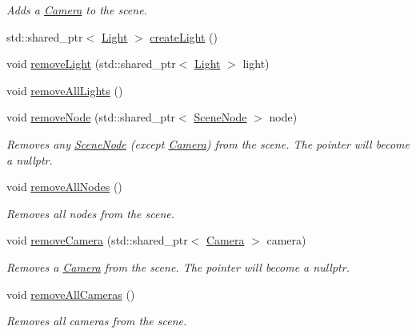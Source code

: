 \begin{DoxyCompactItemize}
\begin{DoxyCompactList}\small\item\em Adds a \hyperlink{classburn_1_1_camera}{Camera} to the scene. \end{DoxyCompactList}\item 
std\-::shared\-\_\-ptr$<$ \hyperlink{classburn_1_1_light}{Light} $>$ \hyperlink{classburn_1_1_scene_a72924fb917b9f55cd7268b65ac81b59d}{create\-Light} ()
\item 
void \hyperlink{classburn_1_1_scene_a60272f8aad568d7475449c649587b9fa}{remove\-Light} (std\-::shared\-\_\-ptr$<$ \hyperlink{classburn_1_1_light}{Light} $>$ light)
\item 
void \hyperlink{classburn_1_1_scene_aeb92e9aea3bbff01d8039ef3b9143f56}{remove\-All\-Lights} ()
\item 
void \hyperlink{classburn_1_1_scene_a3bbc514d911206f374ba54a2efd97c40}{remove\-Node} (std\-::shared\-\_\-ptr$<$ \hyperlink{classburn_1_1_scene_node}{Scene\-Node} $>$ node)
\begin{DoxyCompactList}\small\item\em Removes any \hyperlink{classburn_1_1_scene_node}{Scene\-Node} (except \hyperlink{classburn_1_1_camera}{Camera}) from the scene. The pointer will become a nullptr. \end{DoxyCompactList}\item 
void \hyperlink{classburn_1_1_scene_a2fed244c443937c2656cdc0f65780960}{remove\-All\-Nodes} ()
\begin{DoxyCompactList}\small\item\em Removes all nodes from the scene. \end{DoxyCompactList}\item 
void \hyperlink{classburn_1_1_scene_a2023bc9e2e228c51070d41976bc71a33}{remove\-Camera} (std\-::shared\-\_\-ptr$<$ \hyperlink{classburn_1_1_camera}{Camera} $>$ camera)
\begin{DoxyCompactList}\small\item\em Removes a \hyperlink{classburn_1_1_camera}{Camera} from the scene. The pointer will become a nullptr. \end{DoxyCompactList}\item 
void \hyperlink{classburn_1_1_scene_a9d3f254361eef7ee71052ecdc1576bad}{remove\-All\-Cameras} ()
\begin{DoxyCompactList}\small\item\em Removes all cameras from the scene. \end{DoxyCompactList}\item 

\end{DoxyCompactItemize}
